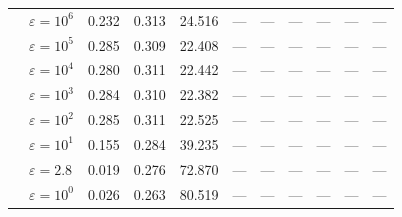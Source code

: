 \begin{tabular}{ll|ccc|ccc|ccc}
 & $\varepsilon=10^{6}$ & 0.232 & 0.313 & 24.516 & --- & --- & --- & --- & --- & --- \\
 & $\varepsilon=10^{5}$ & 0.285 & 0.309 & 22.408 & --- & --- & --- & --- & --- & --- \\
 & $\varepsilon=10^{4}$ & 0.280 & 0.311 & 22.442 & --- & --- & --- & --- & --- & --- \\
 & $\varepsilon=10^{3}$ & 0.284 & 0.310 & 22.382 & --- & --- & --- & --- & --- & --- \\
 & $\varepsilon=10^{2}$ & 0.285 & 0.311 & 22.525 & --- & --- & --- & --- & --- & --- \\
 & $\varepsilon=10^{1}$ & 0.155 & 0.284 & 39.235 & --- & --- & --- & --- & --- & --- \\
 & $\varepsilon=2.8$ & 0.019 & 0.276 & 72.870 & --- & --- & --- & --- & --- & --- \\
 & $\varepsilon=10^{0}$ & 0.026 & 0.263 & 80.519 & --- & --- & --- & --- & --- & --- \\
\bottomrule
\end{tabular}

